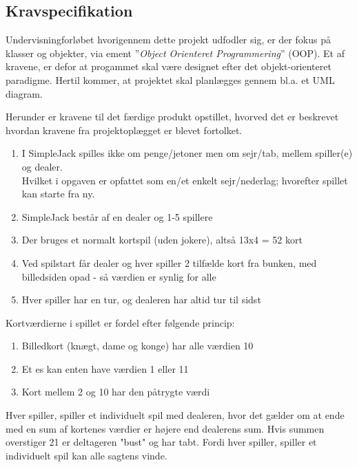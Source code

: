 \documentclass[a4paper]{article}
\begin{document}
  \subsection{Kravspecifikation} \label{ssec:demands}
    Undervisningforløbet hvorigennem dette projekt udfodler sig, er der fokus på klasser og objekter,
    via ement ”\textit{Object Orienteret Programmering}” (OOP).
    Et af kravene, er defor at progammet skal være designet efter det objekt-orienteret paradigme.
    Hertil kommer, at projektet skal planlægges gennem bl.a. et UML diagram.

    Herunder er kravene til det færdige produkt opstillet, hvorved det er beskrevet hvordan kravene fra projektoplægget er blevet fortolket.

    \begin{enumerate}
      \item I SimpleJack spilles ikke om penge/jetoner men om sejr/tab, mellem spiller(e) og dealer.\\
            Hvilket i opgaven er opfattet som en/et enkelt sejr/nederlag; hvorefter spillet kan 
            starte fra ny.
      \item SimpleJack består af en dealer og 1-5 spillere
      \item Der bruges et normalt kortspil (uden jokere), altså 13x4 = 52 kort
      \item Ved spilstart får dealer og hver spiller 2 tilfælde kort fra bunken,
      med billedsiden opad - så værdien er synlig for alle
      \item Hver spiller har en tur, og dealeren har altid tur til sidst
    \end{enumerate}

    Kortværdierne i spillet er fordel efter følgende princip:
    \begin{enumerate}
      \item Billedkort (knægt, dame og konge) har alle værdien 10
      \item Et es kan enten have værdien 1 eller 11
      \item Kort mellem 2 og 10 har den påtrygte værdi
    \end{enumerate}

    Hver spiller, spiller et individuelt spil med dealeren,
    hvor det gælder om at ende med en sum af kortenes værdier er højere end dealerens sum. Hvis summen overstiger 21 er deltageren "bust" og har tabt.
    Fordi hver spiller, spiller et individuelt spil kan alle sagtens vinde.
\end{document}
